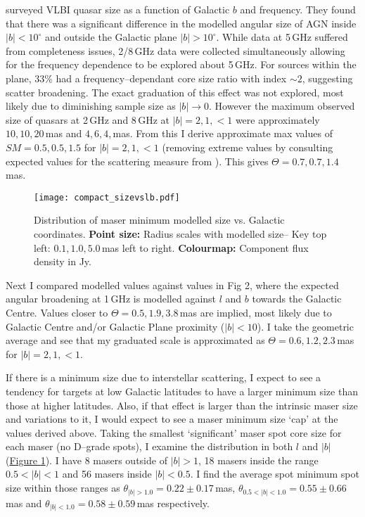         \citet{Pushkarev2015} surveyed VLBI quasar size as a function of Galactic $b$ and frequency. They found that there was a significant difference in the modelled angular size of AGN inside $|b|<10^\circ$ and outside the Galactic plane $|b|>10^\circ$. While data at 5\,GHz suffered from completeness issues, 2/8\,GHz data were collected simultaneously allowing for the frequency dependence to be explored about 5\,GHz. For sources within the plane, 33\% had a frequency--dependant core size ratio with index $\sim2$, suggesting scatter broadening. The exact graduation of this effect was not explored, most likely due to diminishing sample size as $|b|\rightarrow0$. However the maximum observed size of quasars at 2\,GHz and 8\,GHz at $|b|=2,1,<1$ were approximately $10,10,20$\,mas and $4,6,4$,\,mas. From this I derive approximate max values of $SM=0.5,0.5,1.5$ for $|b|=2,1,<1$ (removing extreme values by consulting expected values for the scattering measure from \citet{Cordes1991b}). This gives $\Theta=0.7,0.7,1.4$\,mas.
        \begin{figure}[H]
	        \centering
	        \texttt{[image: compact\_sizevslb.pdf]}
	        \caption[Size distribution in $l$ and $b$]{Distribution of maser minimum modelled size vs. Galactic coordinates. {\bf Point size:} Radius scales with modelled size-- Key top left: $0.1,1.0,5.0$\,mas left to right. {\bf Colourmap:} Component flux density in Jy. }
	        \label{fig:sizevslb}
        \end{figure}
        
        Next I compared modelled values against values in \citet{Cordes1991a} Fig 2, where the expected angular broadening at 1\,GHz is modelled against $l$ and $b$ towards the Galactic Centre. Values closer to $\Theta=0.5,1.9,3.8$\,mas are implied, most likely due to Galactic Centre and/or Galactic Plane proximity ($|b|<10$). I take the geometric average and see that my graduated scale is approximated as $\Theta=0.6,1.2,2.3$\,mas for $|b|=2,1,<1$.
        
        If there is a minimum size due to interstellar scattering, I expect to see a tendency for targets at low Galactic latitudes to have a larger minimum size than those at higher latitudes. Also, if that effect is larger than the intrinsic maser size and variations to it, I would expect to see a maser minimum size `cap' at the values derived above. Taking the smallest `significant' maser spot core size for each maser (no D--grade spots), I examine the distribution in both $l$ and $|b|$ (\hyperref[fig:sizevslb]{Figure \ref*{fig:sizevslb}}). 
        I have 8 masers outside of $|b|>1$, 18 masers inside the range $0.5<|b|<1$ and 56 masers inside $|b|<0.5$. I find the average spot minimum spot size within those ranges as $\theta_{|b|>1.0}=0.22\pm0.17$\,mas, $\theta_{0.5<|b|<1.0}=0.55\pm0.66$\,mas and $\theta_{|b|<1.0}=0.58\pm0.59$\,mas respectively.
        
